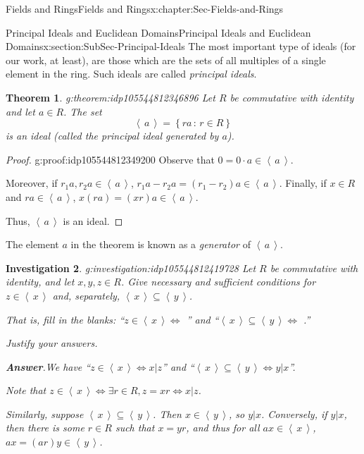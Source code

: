 \documentclass[oneside,10pt,]{book}
\newcommand{\blocktitlefont}{\relax}
\numberwithin{equation}{section}
\newcommand{\ideal}[1]{\left\langle\, #1 \,\right\rangle}
\newcommand{\setof}[2]{{\left\{#1\,\colon\,#2\right\}}}
\newtheorem{theorem}{Theorem}[section]
\newtheorem{investigation}[theorem]{Investigation}
\begin{document}
\begin{chapterptx}{Fields and Rings}{}{Fields and Rings}{}{}{x:chapter:Sec-Fields-and-Rings}
\begin{sectionptx}{Principal Ideals and Euclidean Domains}{}{Principal Ideals and Euclidean Domains}{}{}{x:section:SubSec-Principal-Ideals}
The most important type of ideals (for our work, at least), are those which are the sets of all multiples of a single element in the ring. Such ideals are called \emph{principal ideals}.%
\begin{theorem}{}{}{g:theorem:idp105544812346896}%
Let \(R\) be commutative with identity and let \(a\in R\). The set%
\begin{equation*}
\ideal{a} = \setof{ra}{r\in R}
\end{equation*}
is an ideal (called the \emph{principal ideal generated by \(a\)}).%
\end{theorem}
\begin{proof}{}{g:proof:idp105544812349200}
Observe that \(0 = 0\cdot a \in \ideal{a}\).%
\par
Moreover, if \(r_1 a, r_2 a\in \ideal{a}\), \(r_1 a - r_2 a = (r_1 - r_2)a \in \ideal{a}\). Finally, if \(x\in R\) and \(r a\in \ideal{a}\), \(x (ra) = (xr) a \in \ideal{a}\).%
\par
Thus, \(\ideal{a}\) is an ideal.%
\end{proof}
The element \(a\) in the theorem is known as a \emph{generator} of \(\ideal{a}\).%
\begin{investigation}{}{g:investigation:idp105544812419728}%
Let \(R\) be commutative with identity, and let \(x,y,z\in R\). Give necessary and sufficient conditions for \(z\in \ideal{x}\) and, separately, \(\ideal{x} \subseteq \ideal{y}\).%
\par
That is, fill in the blanks: ``\(z\in \ideal{x} \Leftrightarrow\) \textunderscore{}\textunderscore{}\textunderscore{}\textunderscore{}\textunderscore{}\textunderscore{}\textunderscore{}\textunderscore{}\textunderscore{}'' and ``\(\ideal{x}\subseteq \ideal{y} \Leftrightarrow\) \textunderscore{}\textunderscore{}\textunderscore{}\textunderscore{}\textunderscore{}\textunderscore{}\textunderscore{}\textunderscore{}\textunderscore{}.''%
\par
Justify your answers.%
\par\smallskip%
\noindent\textbf{\blocktitlefont Answer}.\hypertarget{g:answer:idp105544812423824}{}\quad{}We have ``\(z\in \ideal{x} \Leftrightarrow x|z\)'' and ``\(\ideal{x}\subseteq \ideal{y} \Leftrightarrow y|x\)''\footnotemark{}.%
\par
Note that \(z\in \ideal{x} \Leftrightarrow \exists r\in R, z = xr \Leftrightarrow x|z\).%
\par
Similarly, suppose \(\ideal{x}\subseteq \ideal{y}\). Then \(x\in \ideal{y}\), so \(y|x\). Conversely, if \(y|x\), then there is some \(r\in R\) such that \(x = yr\), and thus for all \(ax\in \ideal{x}\), \(ax = (ar)y \in \ideal{y}\).%

\end{investigation}
\end{sectionptx}
\end{chapterptx}
\end{document}
